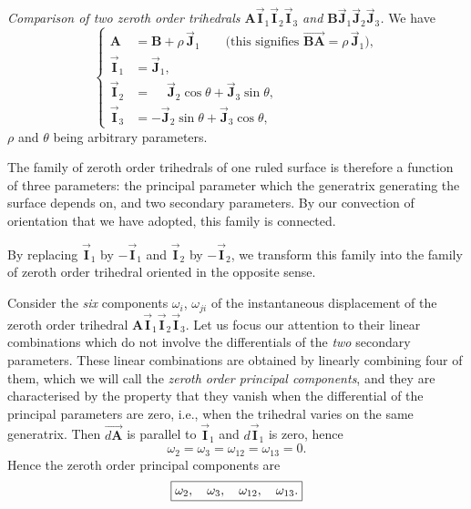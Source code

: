\documentclass[leqno,11pt]{book}
\numberwithin{equation}{chapter}
\theoremstyle{shape1}
\theoremstyle{shapesmall}
\newcommand{\rvec}[1]{\vec{\mathbf{#1}}}
\newcommand{\ivec}{\rvec{I}}
\newcommand{\jvec}{\rvec{J}}
\newcommand{\somespace}{\vspace{9pt}}
\begin{document}
\somespace

\emph{Comparison of two zeroth order trihedrals $\mathbf{A}\ivec_{1}\ivec_{2}\ivec_{3}$ and $\mathbf{B}\jvec_{1}\jvec_{2}\jvec_{3}$.} We have
\begin{equation}
  \label{eq:3.1}
  \left\{
    \begin{aligned}
      \mathbf{A}&=\mathbf{B}+\rho\,\jvec_{1}\qquad\text{(this signifies $\overrightarrow{\mathbf{BA}}=\rho\,\jvec_{1}$)},\\
      \ivec_{1}&=\jvec_{1},\\
      \ivec_{2}&=\phantom{+}\jvec_{2}\cos\theta+\jvec_{3}\sin\theta,\\
      \ivec_{3}&=-\jvec_{2}\sin\theta+\jvec_{3}\cos\theta,
    \end{aligned}
  \right.
\end{equation}
$\rho$ and $\theta$ being arbitrary parameters.

The family of zeroth order trihedrals of one ruled surface is therefore a function of three parameters: the principal parameter which the generatrix generating the surface depends on, and two secondary parameters. By our convection of orientation that we have adopted, this family is connected.

By replacing $\ivec_{1}$ by $-\ivec_{1}$ and $\ivec_{2}$ by $-\ivec_{2}$, we transform this family into the family of zeroth order trihedral oriented in the opposite sense.

Consider the \emph{six} components $\omega_{i}$, $\omega_{ji}$ of the instantaneous displacement of the zeroth order trihedral $\mathbf{A}\ivec_{1}\ivec_{2}\ivec_{3}$. Let us focus our attention to their linear combinations which do not involve the differentials of the \emph{two} secondary parameters. These linear combinations are obtained by linearly combining four of them, which we will call the \emph{zeroth order principal components}, and they are characterised by the property that they vanish when the differential of the principal parameters are zero, i.e., when the trihedral varies on the same generatrix. Then $\overrightarrow{d\mathbf{A}}$ is parallel to $\ivec_{1}$ and $d\ivec_{1}$ is zero, hence
\[
\omega_{2}=\omega_{3}=\omega_{12}=\omega_{13}=0.
\]
Hence the zeroth order principal components are
\[
\boxed{
\omega_{2},\quad\omega_{3},\quad\omega_{12},\quad\omega_{13}.\vphantom{O}
}
\]
\end{document}
